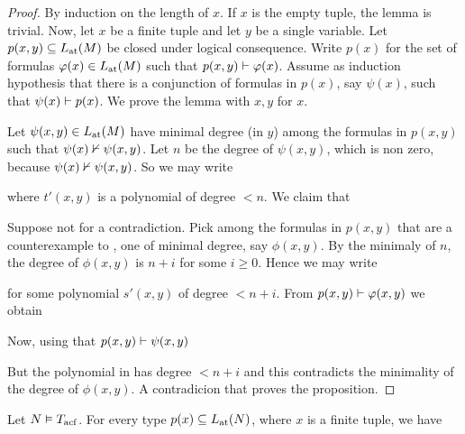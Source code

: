 \begin{proof}
  By induction on the length of $x$.
  If $x$ is the empty tuple, the lemma is trivial.
  Now, let $x$ be a finite tuple and let $y$ be a single variable.
  Let $p(x,y)\subseteq\atL(M)$ be closed under logical consequence.
  Write $p(x)$ for the set of formulas $\phi(x)\in\atL(M)$ such that $p(x,y)\proves\phi(x)$.
  Assume as induction hypothesis that there is a conjunction of formulas in $p(x)$, say $\psi(x)$, such that $\psi(x)\proves p(x)$.
  We prove the lemma with $x,y$ for $x$.

  Let $\psi(x,y)\in\atL(M)$ have minimal degree (in $y$) among the formulas in $p(x,y)$ such that $\psi(x)\notproves\psi(x,y)$.
  Let $n$ be the degree of $\psi(x,y)$, which is non zero, because $\psi(x)\notproves\psi(x,y)$.
  So we may write
  

  where $t'(x,y)$ is a polynomial of degree $<n$. 
  We claim that


  Suppose not for a contradiction.
  Pick among the formulas in $p(x,y)$ that are a counterexample to , one  of minimal degree, say $\phi(x,y)$.  
  By the minimaly of $n$, the degree of $\phi(x,y)$ is $n+i$ for some $i\ge0$. 
  Hence we may write 
  
  
  for some polynomial $s'(x,y)$ of degree $<n+i$.
  From $p(x,y)\proves\phi(x,y)$ we obtain

  
  Now, using that $p(x,y)\proves\psi(x,y)$

  
  But the polynomial in  has degree $<n+i$ and this contradicts the minimality of the degree of $\phi(x,y)$.
  A contradicion that proves the proposition.
\end{proof}

\begin{void}\label{thm_Nullstellensatz1}
  Let $N\models T_{\rm acf}$. 
  For every type $p(x)\subseteq\atL(N)$, where $x$ is a finite tuple, we have

\end{void}

